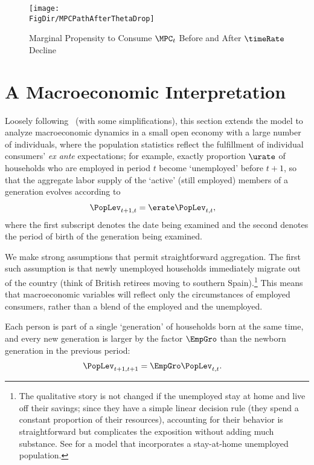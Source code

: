 \documentclass{\handout}
\begin{document}
\begin{figure}
\caption{Marginal Propensity to Consume $\MPC_{t}$ Before and After $\timeRate$ Decline}
\medskip
\texttt{[image: \\FigDir/MPCPathAfterThetaDrop]}
\label{fig:MPCPathAfterThetaDrop}
\end{figure}

\section{A Macroeconomic Interpretation}

Loosely following~\cite{cjSOE} (with some simplifications), this section extends the model to analyze macroeconomic dynamics in a
small open economy with a large number of individuals, where the
population statistics reflect the fulfillment of individual consumers'
{\it ex ante} expectations; for example, exactly proportion $\urate$
of households who are employed in period $t$ become `unemployed' before
$t+1$, so that the aggregate labor supply of the `active' (still employed) members of a generation
evolves according to
\begin{equation}\begin{gathered}\begin{aligned}
  \PopLev_{t+1,t} & =  \erate \PopLev_{t,t}
,
\end{aligned}\end{gathered}\end{equation}
where the first subscript denotes the date being examined and the second denotes
the period of birth of the generation being examined.

We make strong assumptions that permit straightforward aggregation. The first such assumption is that newly unemployed households immediately migrate out of the
country (think of British retirees moving to southern
Spain).\footnote{The qualitative story is not changed if the unemployed stay at home and live off their savings; since they have a simple linear
  decision rule (they spend a constant proportion of their resources),
  accounting for their behavior is straightforward but
  complicates the exposition without adding much substance.  See \cite{cjSOE} for a model that incorporates a stay-at-home unemployed population.}
This means that macroeconomic variables will reflect only the circumstances of 
employed consumers, rather than a blend of the employed and the unemployed.

Each person is part of a single `generation' of households born at the
same time, and every new generation is larger by the factor $\EmpGro$
than the newborn generation in the previous period:
\begin{equation}\begin{gathered}\begin{aligned}
  \PopLev_{t+1,t+1} & =  \EmpGro \PopLev_{t,t}
.
\end{aligned}\end{gathered}\end{equation}
\end{document}
